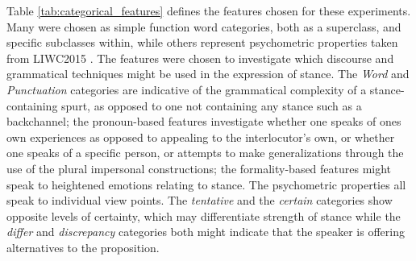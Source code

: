 Table \ref{tab:categorical_features} defines the features chosen for these experiments.  Many were chosen as simple function word categories, both as a superclass, and specific subclasses within, while others represent psychometric properties taken from LIWC2015 \citep{pennebaker2015linguistic}.  The features were chosen to investigate which discourse and grammatical techniques might be used in the expression of stance.  The \emph{Word} and \emph{Punctuation} categories are indicative of the grammatical complexity of a stance-containing spurt, as opposed to one not containing any stance such as a backchannel; the pronoun-based features investigate whether one speaks of ones own experiences as opposed to appealing to the interlocutor's own, or whether one speaks of a specific person, or attempts to make generalizations through the use of the plural impersonal constructions; the formality-based features might speak to heightened emotions relating to stance.  The psychometric properties all speak to individual view points.   The \emph{tentative} and the \emph{certain} categories show opposite levels of certainty, which may differentiate strength of stance while the \emph{differ} and \emph{discrepancy} categories both might indicate that the speaker is offering alternatives to the proposition.  



